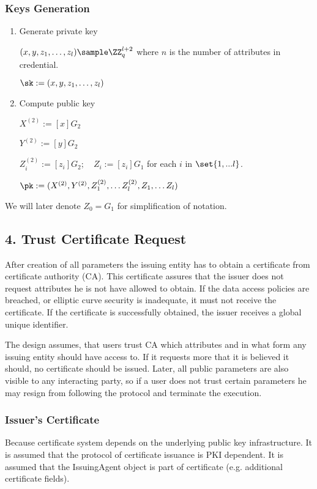 \subsubsection*{Keys Generation}
\begin{enumerate}
    \item Generate private key
    
    $(x, y, z_1, \dots, z_l) \sample \ZZ_q^{l+2}$ where $n$ is the number of attributes in credential.
    
    $\sk := (x, y, z_1, \dots, z_l)$
    
    \item Compute public key
    
    $X^{(2)} := [x]G_2$
    
    $Y^{(2)} := [y]G_2$
    
    $Z^{(2)}_i := [z_i]G_2; \quad Z_i := [z_i]G_1$ for each $i$ in $\set{1, ... l}$.
    
    $\pk := (X^{(2)}, Y^{(2)}, Z^{(2)}_1, \dots Z^{(2)}_l, Z_1, \dots Z_l)$
    
\end{enumerate}

\noindent We will later denote $Z_0 = G_1$ for simplification of notation.


\subsection*{4. Trust Certificate Request}
After creation of all parameters the issuing entity has to obtain a certificate from certificate authority (CA). This certificate assures that the issuer does not request attributes he is not have allowed to obtain. If the data access policies are breached, or elliptic curve security is inadequate, it must not receive the certificate. If the certificate is successfully obtained, the issuer receives a global unique identifier.

The design assumes, that users trust CA which attributes and in what form any issuing entity should have access to. If it requests more that it is believed it should, no certificate should be issued. Later, all public parameters are also visible to any interacting party, so if a user does not  trust certain parameters he may resign from following the protocol and terminate the execution.

\subsubsection*{Issuer's Certificate}
Because certificate system depends on the underlying public key infrastructure. It is assumed that the protocol of certificate issuance is PKI dependent. It is assumed that the \textsf{IssuingAgent} object is part of certificate (e.g. additional certificate fields).




